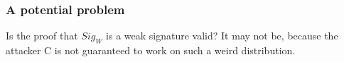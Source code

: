 \documentclass[10pt]{article}
\begin{document}
\subsubsection*{A potential problem}
Is the proof that $Sig_W$ is a weak signature valid? It may not be, because the attacker C is not guaranteed to work on such a weird distribution.

% 
% 
% 
% 
\end{document}
